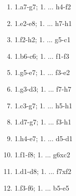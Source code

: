 \begin{enumerate}
\setcounter{enumi}{\value{d_counter}}
\item 1.\queen{}a7-g7\mate{}; 1. ... \queen{}h4-f2\mate{}
\item 1.\queen{}e2-e8\mate{}; 1. ... \queen{}h7-h1\mate{}
\item 1.\queen{}f2-h2\mate{}; 1. ... \queen{}g5-c1\mate{}
\item 1.\queen{}b6-c6\mate{}; 1. ... \queen{}f1-f3\mate{}
\item 1.\queen{}g5-e7\mate{}; 1. ... \queen{}f3-e2\mate{}
\item 1.\queen{}g3-d3\mate{}; 1. ... \queen{}f7-h7\mate{}

\item 1.\queen{}c3-g7\mate{}; 1. ... \queen{}h5-h1\mate{}
\item 1.\queen{}d7-g7\mate{}; 1. ... \queen{}f3-h1\mate{}
\item 1.\queen{}h4-e7\mate{}; 1. ... \queen{}d5-d1\mate{}
\item 1.\queen{}f1-f8\mate{}; 1. ... \queen{}g6xc2\mate{}
\item 1.\queen{}d1-d8\mate{}; 1. ... \queen{}f7xf2\mate{}
\item 1.\queen{}f3-f6\mate{}; 1. ... \queen{}b5-e5\mate{}
\setcounter{d_counter}{\value{enumi}}
\end{enumerate}